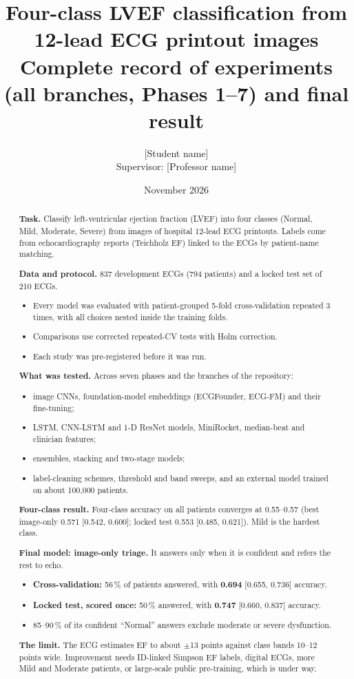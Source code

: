 \documentclass[11pt,a4paper]{article}
\title{\textbf{Four-class LVEF classification from 12-lead ECG printout images}\\[4pt]
\large Complete record of experiments (all branches, Phases 1--7) and final result}
\author{[Student name] \\ Supervisor: [Professor name]}
\date{November 2026}
\begin{document}
\maketitle

\begin{abstract}
\noindent \textbf{Task.} Classify left-ventricular ejection fraction (LVEF) into four classes (Normal, Mild, Moderate,
Severe) from images of hospital 12-lead ECG printouts. Labels come from echocardiography reports (Teichholz EF) linked
to the ECGs by patient-name matching.

\noindent \textbf{Data and protocol.} 837 development ECGs (794 patients) and a locked test set of 210 ECGs.
\begin{itemize}
  \item Every model was evaluated with patient-grouped 5-fold cross-validation repeated 3 times, with all choices
    nested inside the training folds.
  \item Comparisons use corrected repeated-CV tests with Holm correction.
  \item Each study was pre-registered before it was run.
\end{itemize}

\noindent \textbf{What was tested.} Across seven phases and the branches of the repository:
\begin{itemize}
  \item image CNNs, foundation-model embeddings (ECGFounder, ECG-FM) and their fine-tuning;
  \item LSTM, CNN-LSTM and 1-D ResNet models, MiniRocket, median-beat and clinician features;
  \item ensembles, stacking and two-stage models;
  \item label-cleaning schemes, threshold and band sweeps, and an external model trained on about 100,000 patients.
\end{itemize}

\noindent \textbf{Four-class result.} Four-class accuracy on all patients converges at 0.55--0.57 (best image-only
0.571 [0.542, 0.600]; locked test 0.553 [0.485, 0.621]). Mild is the hardest class.

\noindent \textbf{Final model: image-only triage.} It answers only when it is confident and refers the rest to echo.
\begin{itemize}
  \item \textbf{Cross-validation:} 56\,\% of patients answered, with \textbf{0.694} [0.655, 0.736] accuracy.
  \item \textbf{Locked test, scored once:} 50\,\% answered, with \textbf{0.747} [0.660, 0.837] accuracy.
  \item 85--90\,\% of its confident ``Normal'' answers exclude moderate or severe dysfunction.
\end{itemize}

\noindent \textbf{The limit.} The ECG estimates EF to about $\pm$13 points against class bands 10--12 points wide.
Improvement needs ID-linked Simpson EF labels, digital ECGs, more Mild and Moderate patients, or large-scale public
pre-training, which is under way.
\end{abstract}

\tableofcontents
\newpage








\end{document}
